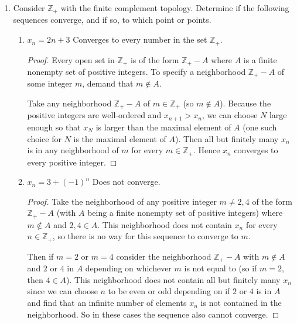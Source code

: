 \documentclass[11pt]{article}
\DeclareMathOperator{\Int}{Int}
\DeclareMathOperator{\Bd}{Bd}
\begin{document}
\begin{enumerate}
\begin{enumerate}[label=(\alph*)]
\begin{proof}
        Conversely, suppose that $x\in \Int(A)\cup\Bd(A)$, so that either $x\in\Int(A)$ or $x\in\Bd(A)$ (but not both). If $x\in \Int(A)$ then there exists a neighborhood of $x$ contained in $A$, from which it follows that $x\in A$ and so every neighborhood containing $x$ necessarily intersects nontrivially with $A$. In this case $x\in \overline{A}$. In the other case, $x\in \Bd(A)$ so that every neighborhood of $x$ contains points in $A$ as well as points in $X-A$; this is enough to see that every neighborhood of $x$ intersects nontrivially with $A$ so that $x\in \overline{A}$.

        Hence $\overline{A} = \Int(A)\cup\Bd(A)$.
      \end{proof}
    \end{enumerate}
    \item Consider $\mathbb{Z}_+$ with the finite complement topology. Determine if the following sequences converge, and if so, to which point or points. \begin{enumerate}[label=(\alph*)]
      \item $x_n = 2n+3$
      \quad Converges to every number in the set $\mathbb{Z}_+$.
      \begin{proof}
        Every open set in $\mathbb{Z}_+$ is of the form $\mathbb{Z}_+ - A$ where $A$ is a finite nonempty set of positive integers. To specify a neighborhood $\mathbb{Z}_+-A$ of some integer $m$, demand that $m\not\in A$.
        
        Take any neighborhood $\mathbb{Z}_+-A$ of $m\in\mathbb{Z}_+$ (so $m\not\in A$). Because the positive integers are well-ordered and $x_{n+1} > x_n$, we can choose $N$ large enough so that $x_N$ is larger than the maximal element of $A$ (one such choice for $N$ is the maximal element of $A$). Then all but finitely many $x_n$ is in any neighborhood of $m$ for every $m\in \mathbb{Z}_+$. Hence $x_n$ converges to every positive integer.
      \end{proof}
      \item $x_n = 3+(-1)^n$
      \quad Does not converge.
      \begin{proof}
        Take the neighborhood of any positive integer $m\neq 2,4$ of the form $\mathbb{Z}_+-A$ (with $A$ being a finite nonempty set of positive integers) where $m\not\in A$ and $2,4\in A$. This neighborhood does not contain $x_n$ for every $n\in\mathbb{Z}_+$, so there is no way for this sequence to converge to $m$. 

        Then if $m = 2$ or $m = 4$ consider the neighborhood $\mathbb{Z}_+-A$ with $m\not\in A$ and $2$ or $4$ in $A$ depending on whichever $m$ is not equal to (so if $m = 2$, then $4\in A$). This neighborhood does not contain all but finitely many $x_n$ since we can choose $n$ to be even or odd depending on if $2$ or $4$ is in $A$ and find that an infinite number of elements $x_n$ is not contained in the neighborhood. So in these cases the sequence also cannot converge.


\end{proof}
\end{enumerate}
\end{enumerate}
\end{document}
